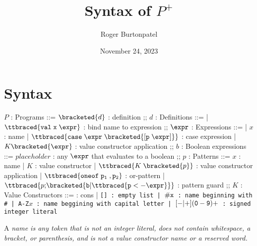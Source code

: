 \documentclass[]{article}
\title{Syntax of $P^{+}$}
\author{Roger Burtonpatel}
\date{November 24, 2023}
\begin{document}
\maketitle

\newcommand\la{\langle}
\newcommand\ra{\rangle}
\def\<#1>{\synt{#1}}

\newcommand\B[1]{\synt{#1}}

\section{Syntax}

\bigskip 
\begin{center}
    \begin{bnf}

    $P$ : \textsf{Programs} ::=
    $\bracketed{d}$ : definition
    ;;
    $d$ : \textsf{Definitions} ::=
    | $\ttbraced{\tt{val} \; x \; \expr}$ : bind name to expression
    ;;
    $\expr$ : \textsf{Expressions} ::=
    | $x$ : name
    | $\ttbraced{\tt{case} \; \expr \; \bracketed{\tt{[} p \; \expr \tt{]}}}$ : case expression 
    | $K \bracketed{\expr}$ : value constructor application 
    ;;
    $b$ : Boolean expressions ::=
     $\mathit{placeholder}$ : any $\expr$ that evaluates to a boolean 
    ;;
    $p$ : \textsf{Patterns} ::= $x$ : name 
    | $K$ : value constructor 
    | $\ttbraced{K \; \bracketed{p}}$ : value constructor application 
    | $\ttbraced{\tt{oneof} \; p_{1} \;, p_{2} }$ : or-pattern 
    | $\ttbraced{p \tt{;} \bracketed{b \vert \ttbraced{p  <- \expr}}}$ : pattern guard
    ;;
    $K$ : \textsf{Value Constructors} ::=
    \cons : cons 
    | \tt{[]} : empty list 
    | $\tt{\#}x$ : name beginning with \tt{\#}
    | \tt{A-Z}$x$ : name beggining with capital letter
    | $[\tt{-}\vert\tt{+}](\tt{0}-\tt{9})+$ : signed integer literal 

    \end{bnf}
\end{center}
\bigskip 

A \it{name} is any token that is not an integer literal, 
does not contain whitespace, a bracket, or parenthesis, 
and is not a value constructor name or a reserved word.

\bigskip

\end{document}
